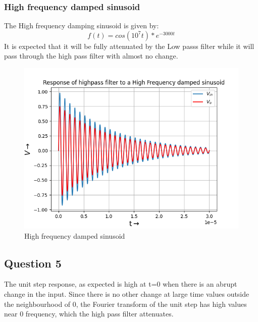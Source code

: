 \documentclass{article}
\begin{document}
\subsubsection{High frequency damped sinusoid}
The High frequency damping sinusoid is given by:
\begin{equation}
    f(t) = cos(10^7t)*e^{-3000t}
\end{equation}
It is expected that it will be fully attenuated by the Low passs filter while it will pass through the high pass filter with almost no change.
\begin{figure}[h!]
\centering
\includegraphics[scale=0.6]{Figure_8.png}
\caption{High frequency damped sinusoid}
\label{fig:System Response with Decay = 0.05}
\end{figure}



\subsection{Question 5}
The unit step response, as expected is high at t=0 when there is an abrupt change in the input. Since there is no other change at large time values outside the neighbourhood of 0, the Fourier transform of the unit step has high values near 0 frequency, which the high pass filter attenuates.
\end{document}
